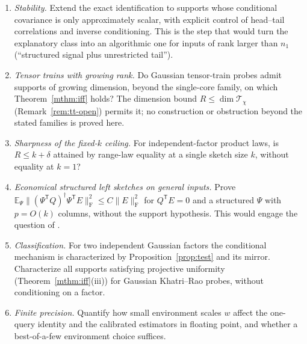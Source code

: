 \documentclass[11pt,a4paper]{article}
\theoremstyle{definition}
\theoremstyle{remark}
\numberwithin{equation}{section}
\newcommand{\E}{\mathbb E}
\newcommand{\T}{{\mathsf T}}
\newcommand{\norm}[1]{\lVert#1\rVert}
\newcommand{\F}{\mathrm F}
\begin{document}
\begin{enumerate}
\item \emph{Stability.} Extend the exact identification to supports whose
      conditional covariance is only approximately scalar, with explicit
      control of head--tail correlations and inverse conditioning. This is the
      step that would turn the explanatory class into an algorithmic one for
      inputs of rank larger than $n_1$ (``structured signal plus unrestricted
      tail'').
\item \emph{Tensor trains with growing rank.} Do Gaussian tensor-train probes
      admit supports of growing dimension, beyond the single-core family, on
      which Theorem~\ref{mthm:iff} holds? The dimension bound
      $R\le\dim\mathcal T_\chi$ (Remark~\ref{rem:tt-open}) permits it; no
      construction or obstruction beyond the stated families is proved here.
\item \emph{Sharpness of the fixed-$k$ ceiling.} For independent-factor
      product laws, is $R\le k+\delta$ attained by range-law equality at a
      single sketch size $k$, without equality at $k=1$?
\item \emph{Economical structured left sketches on general inputs.} Prove
      $\E_\Psi\norm{(\Psi^\T Q)^\dagger\Psi^\T E}_\F^2\le C\norm E_\F^2$ for
      $Q^\T E=0$ and a structured $\Psi$ with $p=O(k)$ columns, without the
      support hypothesis. This would engage the question of
      \cite[Remark~2.9]{CEMT}.
\item \emph{Classification.} For two independent Gaussian factors the
      conditional mechanism is characterized by Proposition~\ref{prop:test} and
      its mirror. Characterize all supports satisfying projective uniformity
      (Theorem~\ref{mthm:iff}(iii)) for Gaussian Khatri--Rao probes, without
      conditioning on a factor.
\item \emph{Finite precision.} Quantify how small environment scales $w$
      affect the one-query identity and the calibrated estimators in floating
      point, and whether a best-of-a-few environment choice suffices.
\end{enumerate}
\begingroup\small
\end{document}
